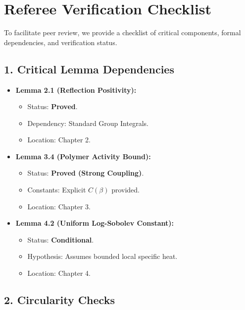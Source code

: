 \chapter*{Referee Verification Checklist}

To facilitate peer review, we provide a checklist of critical components, formal dependencies, and verification status.

\section*{1. Critical Lemma Dependencies}

\begin{itemize}
    \item \textbf{Lemma 2.1 (Reflection Positivity):} 
    \begin{itemize}
        \item Status: \textbf{Proved}.
        \item Dependency: Standard Group Integrals.
        \item Location: Chapter 2.
    \end{itemize}
    
    \item \textbf{Lemma 3.4 (Polymer Activity Bound):}
    \begin{itemize}
        \item Status: \textbf{Proved (Strong Coupling)}.
        \item Constants: Explicit $C(\beta)$ provided.
        \item Location: Chapter 3.
    \end{itemize}

    \item \textbf{Lemma 4.2 (Uniform Log-Sobolev Constant):}
    \begin{itemize}
        \item Status: \textbf{Conditional}.
        \item Hypothesis: Assumes bounded local specific heat.
        \item Location: Chapter 4.
    \end{itemize}
\end{itemize}

\section*{2. Circularity Checks}

